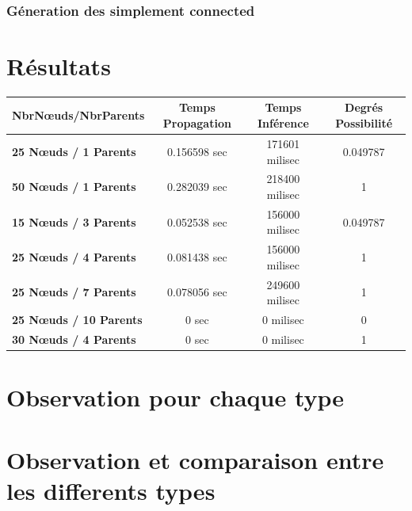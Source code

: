 \documentclass[12pt,a4paper,oneside]{book}
\begin{document}
    \subsubsection{Géneration des simplement connected}
    \section{Résultats}
    
\begin{center}
\begin{tabular}{|l||c|c|c|}
	\hline
	\textbf{NbrNœuds/NbrParents} &	\textbf{Temps Propagation} & \textbf{Temps Inférence} &  \textbf{Degrés Possibilité}
	\\
	\hline
	

		
	\textbf{25 Nœuds / 1 Parents} & 0.156598 sec & 171601 milisec  & 0.049787
	\\
	\hline
	
	\textbf{50 Nœuds / 1 Parents} & 0.282039 sec & 218400 milisec  & 1
	\\
	\hline
	
	\textbf{15 Nœuds / 3 Parents} & 0.052538 sec & 156000 milisec  & 0.049787
	\\
	\hline
	
	\textbf{25 Nœuds / 4 Parents} &  0.081438 sec & 156000 milisec  & 1
	\\
	\hline
	
	\textbf{25 Nœuds / 7 Parents} & 0.078056 sec & 249600 milisec  & 1
	\\
	\hline
	
	\textbf{25 Nœuds / 10 Parents} & 0 sec & 0 milisec  & 0
	\\
	\hline
	
	\textbf{30 Nœuds / 4 Parents} & 0 sec & 0 milisec  & 1
	\\
	\hline
	


\end{tabular} 
\end{center}
    
    \section{Observation pour chaque type }
    \section{Observation et comparaison entre les differents types}
\end{document}
